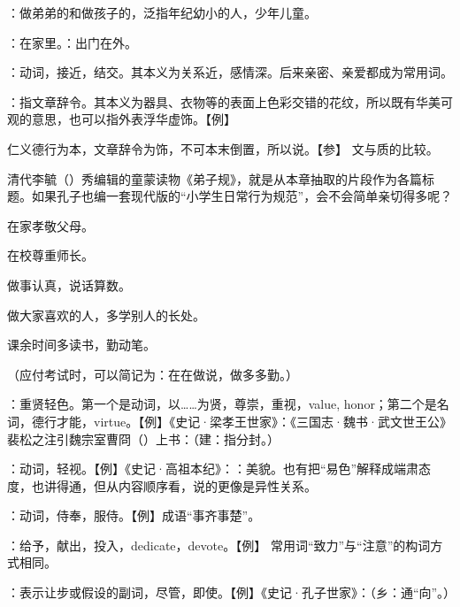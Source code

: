 {
\item {}：做弟弟的和做孩子的，泛指年纪幼小的人，少年儿童。
\item {}：在家里。：出门在外。
\item {}：动词，接近，结交。其本义为关系近，感情深。后来亲密、亲爱都成为常用词。
\item {}：指文章辞令。其本义为器具、衣物等的表面上色彩交错的花纹，所以既有华美可观的意思，也可以指外表浮华虚饰。【例】 

\item 仁义德行为本，文章辞令为饰，不可本末倒置，所以说。【参】 文与质的比较。 
}
{
清代李毓（）秀编辑的童蒙读物《弟子规》，就是从本章抽取的片段作为各篇标题。如果孔子也编一套现代版的“小学生日常行为规范”，会不会简单亲切得多呢？
\begin{lyenumerate}
\item 在家孝敬父母。
\item 在校尊重师长。%
\item 做事认真，说话算数。
\item 做大家喜欢的人，多学别人的长处。
\item 课余时间多读书，勤动笔。
\end{lyenumerate}
（应付考试时，可以简记为：在在做说，做多多勤。）
}


{
\item {}：重贤轻色。第一个是动词，以……为贤，尊崇，重视，value, honor；第二个是名词，德行才能，virtue。【例】《史记·梁孝王世家》：《三国志·魏书·武文世王公》裴松之注引魏宗室曹冏（）上书：（建：指分封。）

：动词，轻视。【例】《史记·高祖本纪》：：美貌。也有把“易色”解释成端肃态度，也讲得通，但从内容顺序看，说的更像是异性关系。
\item {}：动词，侍奉，服侍。【例】成语“事齐事楚”。

\item {}：给予，献出，投入，dedicate，devote。【例】 常用词“致力”与“注意”的构词方式相同。
\item {}：表示让步或假设的副词，尽管，即使。【例】《史记·孔子世家》：（乡：通“向”。）
}
{}



